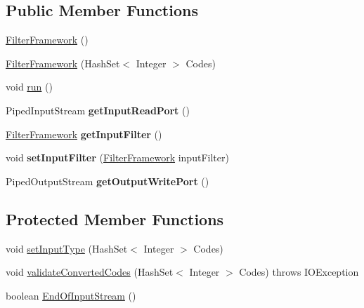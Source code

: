 \subsection*{Public Member Functions}
\begin{DoxyCompactItemize}
\item 
\hyperlink{class_system_a_1_1_filter_framework_ad7ebd0cd900fb578711b6b84079dc80a}{Filter\+Framework} ()
\item 
\hyperlink{class_system_a_1_1_filter_framework_a640d5b39042aa0a66acc3261b03b0434}{Filter\+Framework} (Hash\+Set$<$ Integer $>$ Codes)
\item 
void \hyperlink{class_system_a_1_1_filter_framework_a00efe5c6b5044acdf17db71c297d062e}{run} ()
\item 
\hypertarget{class_system_a_1_1_filter_framework_af98ac10ab07bb2e0e6668590803fc72b}{}Piped\+Input\+Stream {\bfseries get\+Input\+Read\+Port} ()\label{class_system_a_1_1_filter_framework_af98ac10ab07bb2e0e6668590803fc72b}

\item 
\hypertarget{class_system_a_1_1_filter_framework_aae378e5c79852b768d6bd96bd9d0b36e}{}\hyperlink{class_system_a_1_1_filter_framework}{Filter\+Framework} {\bfseries get\+Input\+Filter} ()\label{class_system_a_1_1_filter_framework_aae378e5c79852b768d6bd96bd9d0b36e}

\item 
\hypertarget{class_system_a_1_1_filter_framework_a48f93e54ac19d8208cb42a59e4259b0d}{}void {\bfseries set\+Input\+Filter} (\hyperlink{class_system_a_1_1_filter_framework}{Filter\+Framework} input\+Filter)\label{class_system_a_1_1_filter_framework_a48f93e54ac19d8208cb42a59e4259b0d}

\item 
\hypertarget{class_system_a_1_1_filter_framework_a53f809bc98980394826252ac762cd9e0}{}Piped\+Output\+Stream {\bfseries get\+Output\+Write\+Port} ()\label{class_system_a_1_1_filter_framework_a53f809bc98980394826252ac762cd9e0}

\end{DoxyCompactItemize}
\subsection*{Protected Member Functions}
\begin{DoxyCompactItemize}
\item 
void \hyperlink{class_system_a_1_1_filter_framework_a856b3a8b6b49ad1124de579485e86122}{set\+Input\+Type} (Hash\+Set$<$ Integer $>$ Codes)
\item 
void \hyperlink{class_system_a_1_1_filter_framework_a20e7a6999d87d75474742dafd6edb482}{validate\+Converted\+Codes} (Hash\+Set$<$ Integer $>$ Codes)  throws I\+O\+Exception
\item 
boolean \hyperlink{class_system_a_1_1_filter_framework_ac54511ad34d190b58ea3baecd6a70692}{End\+Of\+Input\+Stream} ()
\end{DoxyCompactItemize}


